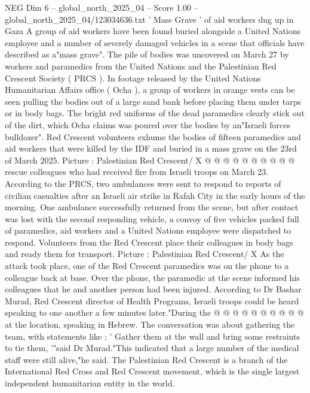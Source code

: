 \begin{textsample}{NEG Dim 6 – global\_north\_2025\_04 – Score 1.00 – global\_north\_2025\_04/123034636.txt}  \label{ex:f6_neg_243}
' Mass Grave ' of aid workers dug up in Gaza A group of aid workers have been found buried alongside a United Nations employee and a number of severely damaged vehicles in a scene that officials have described as a"mass grave".
The pile of bodies was uncovered on March 27 by workers and paramedics from the United Nations and the Palestinian Red Crescent Society ( PRCS ).
In footage released by the United Nations Humanitarian Affairs office ( Ocha ), a group of workers in orange vests can be seen pulling the bodies out of a large sand bank before placing them under tarps or in body bags.
The bright red uniforms of the dead paramedics clearly stick out of the dirt, which Ocha claims was poured over the bodies by an"Israeli forces bulldozer".
Red Crescent volunteers exhume the bodies of fifteen paramedics and aid workers that were killed by the IDF and buried in a mass grave on the 23rd of March 2025.
Picture : Palestinian Red Crescent/ X @ @ @ @ @ @ @ @ @ @ rescue colleagues who had received fire from Israeli troops on March 23.
According to the PRCS, two ambulances were sent to respond to reports of civilian casualties after an Israeli air strike in Rafah City in the early hours of the morning.
One ambulance successfully returned from the scene, but after contact was lost with the second responding vehicle, a convoy of five vehicles packed full of paramedics, aid workers and a United Nations employee were dispatched to respond.
Volunteers from the Red Crescent place their colleagues in body bags and ready them for transport.
Picture : Palestinian Red Crescent/ X As the attack took place, one of the Red Crescent paramedics was on the phone to a colleague back at base.
Over the phone, the paramedic at the scene informed his colleagues that he and another person had been injured.
According to Dr Bashar Murad, Red Crescent director of Health Programs, Israeli troops could be heard speaking to one another a few minutes later."During the @ @ @ @ @ @ @ @ @ @ at the location, speaking in Hebrew.
The conversation was about gathering the team, with statements like ; ' Gather them at the wall and bring some restraints to tie them, '"said Dr Murad."This indicated that a large number of the medical staff were still alive,"he said.
The Palestinian Red Crescent is a branch of the International Red Cross and Red Crescent movement, which is the single largest independent humanitarian entity in the world.

\end{textsample}
